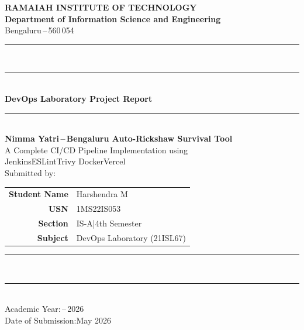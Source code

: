 \documentclass[12pt,a4paper,oneside]{report}
\renewcommand{\arraystretch}{1.45}
\begin{document}
\begin{titlepage}
  \thispagestyle{empty}
  \centering\singlespacing

  \vspace*{10pt}
  {\bfseries\fontsize{18}{22}\selectfont RAMAIAH INSTITUTE OF TECHNOLOGY}\\[6pt]
  {\bfseries\fontsize{13}{16}\selectfont
    Department of Information Science and Engineering}\\[4pt]
  {\fontsize{12}{14}\selectfont Bengaluru\,--\,560\,054}\\[8pt]

  \rule{\textwidth}{1.8pt}\\[3pt]
  \rule{\textwidth}{0.5pt}\\[28pt]

  {\bfseries\fontsize{19}{23}\selectfont\color{navytext}
    DevOps Laboratory Project Report}\\[10pt]
  \rule{0.45\textwidth}{0.5pt}\\[10pt]

  {\bfseries\fontsize{15}{18}\selectfont\color{navytext}
    Nimma Yatri\,--\,Bengaluru Auto-Rickshaw Survival Tool}\\[8pt]

  {\fontsize{12}{15}\selectfont
    A Complete CI/CD Pipeline Implementation using\\[3pt]
    Jenkins\;\textbullet\;ESLint\;\textbullet\;Trivy\;\textbullet\;
    Docker\;\textbullet\;Vercel}\\[36pt]

  {\fontsize{12}{14}\selectfont Submitted by:}\\[14pt]

  \renewcommand{\arraystretch}{1.6}
  \begin{tabular}{r@{\hskip 6pt:\hskip 8pt}l}
    \textbf{Student Name} & Harshendra M \\
    \textbf{USN}          & 1MS22IS053 \\
    \textbf{Section}      & IS-A\enspace|\enspace 4th Semester \\
    \textbf{Subject}      & DevOps Laboratory (21ISL67) \\
  \end{tabular}
  \renewcommand{\arraystretch}{1.45}

  \vfill

  \rule{\textwidth}{0.5pt}\\[3pt]
  \rule{\textwidth}{1.8pt}\\[10pt]
  {\fontsize{12}{14}\selectfont Academic Year:\,--\,2026}\\[4pt]
  {\fontsize{12}{14}\selectfont Date of Submission:\enspace May 2026}
\end{titlepage}
\end{document}
